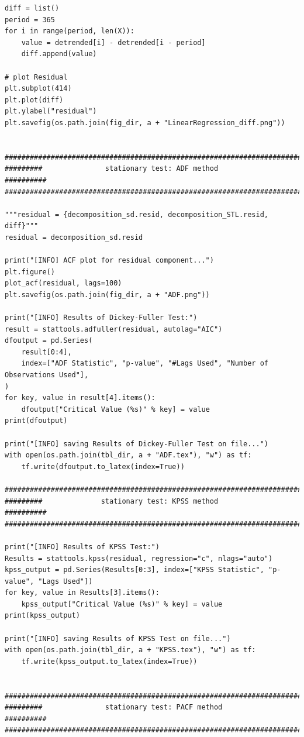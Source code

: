 \documentclass[12pt]{article}
\begin{document}
\begin{lstlisting}
diff = list()
period = 365
for i in range(period, len(X)):
    value = detrended[i] - detrended[i - period]
    diff.append(value)

# plot Residual
plt.subplot(414)
plt.plot(diff)
plt.ylabel("residual")
plt.savefig(os.path.join(fig_dir, a + "LinearRegression_diff.png"))


############################################################################
#########               stationary test: ADF method               ##########
############################################################################

"""residual = {decomposition_sd.resid, decomposition_STL.resid, diff}"""
residual = decomposition_sd.resid

print("[INFO] ACF plot for residual component...")
plt.figure()
plot_acf(residual, lags=100)
plt.savefig(os.path.join(fig_dir, a + "ADF.png"))

print("[INFO] Results of Dickey-Fuller Test:")
result = stattools.adfuller(residual, autolag="AIC")
dfoutput = pd.Series(
    result[0:4],
    index=["ADF Statistic", "p-value", "#Lags Used", "Number of Observations Used"],
)
for key, value in result[4].items():
    dfoutput["Critical Value (%s)" % key] = value
print(dfoutput)

print("[INFO] saving Results of Dickey-Fuller Test on file...")
with open(os.path.join(tbl_dir, a + "ADF.tex"), "w") as tf:
    tf.write(dfoutput.to_latex(index=True))

############################################################################
#########              stationary test: KPSS method               ##########
############################################################################

print("[INFO] Results of KPSS Test:")
Results = stattools.kpss(residual, regression="c", nlags="auto")
kpss_output = pd.Series(Results[0:3], index=["KPSS Statistic", "p-value", "Lags Used"])
for key, value in Results[3].items():
    kpss_output["Critical Value (%s)" % key] = value
print(kpss_output)

print("[INFO] saving Results of KPSS Test on file...")
with open(os.path.join(tbl_dir, a + "KPSS.tex"), "w") as tf:
    tf.write(kpss_output.to_latex(index=True))


############################################################################
#########               stationary test: PACF method              ##########
############################################################################



\end{lstlisting}
\end{document}
